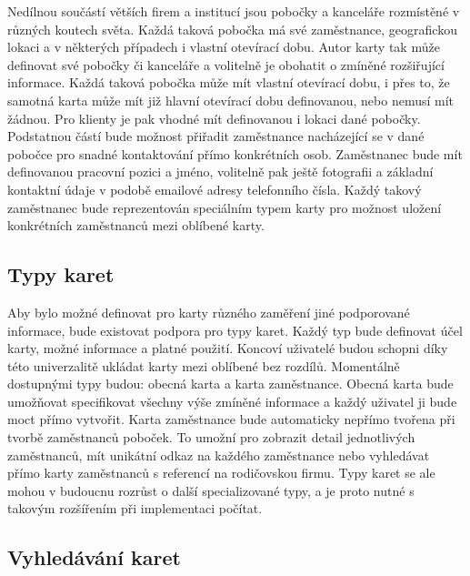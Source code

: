 \begin{itemize}
\begin{itemize}
	Nedílnou součástí větších firem a institucí jsou pobočky a kanceláře rozmístěné v různých koutech světa.
	Každá taková pobočka má své zaměstnance, geografickou lokaci a v některých případech i vlastní otevírací dobu.
	Autor karty tak může definovat své pobočky či kanceláře a volitelně je obohatit o zmíněné rozšiřující informace.
	Každá taková pobočka může mít vlastní otevírací dobu, i přes to, že samotná karta může mít již hlavní otevírací dobu
	definovanou, nebo nemusí mít žádnou.
	Pro klienty je pak vhodné mít definovanou i lokaci dané pobočky.
	Podstatnou částí bude možnost přiřadit zaměstnance nacházející se v dané pobočce pro snadné kontaktování přímo konkrétních
	osob.
	Zaměstnanec bude mít definovanou pracovní pozici a jméno, volitelně pak ještě fotografii a základní kontaktní údaje
	v podobě emailové adresy telefonního čísla.
	Každý takový zaměstnanec bude reprezentován speciálním typem karty pro možnost uložení konkrétních zaměstnanců mezi oblíbené
	karty.

	\subsection{Typy karet}

	Aby bylo možné definovat pro karty různého zaměření jiné podporované informace, bude existovat podpora pro typy karet.
	Každý typ bude definovat účel karty, možné informace a platné použití.
	Koncoví uživatelé budou schopni díky této univerzalitě ukládat karty mezi oblíbené bez rozdílů.
	Momentálně dostupnými typy budou: obecná karta a karta zaměstnance.
	Obecná karta bude umožňovat specifikovat všechny výše zmíněné informace a každý uživatel ji bude moct přímo vytvořit.
	Karta zaměstnance bude automaticky nepřímo tvořena při tvorbě zaměstnanců poboček.
	To umožní pro zobrazit detail jednotlivých zaměstnanců, mít unikátní odkaz na každého zaměstnance nebo vyhledávat
	přímo karty zaměstnanců s referencí na rodičovskou firmu.
	Typy karet se ale mohou v budoucnu rozrůst o další specializované typy, a je proto nutné s takovým rozšířením při
	implementaci počítat.

	\subsection{Vyhledávání karet}


\end{itemize}
\end{itemize}
